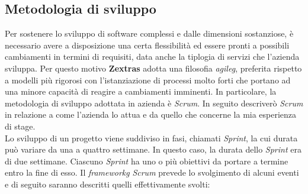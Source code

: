 \subsection{Metodologia di sviluppo}
    Per sostenere lo sviluppo di software complessi e dalle dimensioni sostanziose, è necessario avere a disposizione una certa flessibilità ed essere pronti a possibili cambiamenti in termini di requisiti, data anche la tiplogia di servizi che l'azienda sviluppa. Per questo motivo \textbf{Zextras} adotta una filosofia \textit{\gls{agileg}}, preferita rispetto a modelli più rigorosi con l'istanziazione di processi molto forti che portano ad una minore capacità di reagire a cambiamenti imminenti. In particolare, la metodologia di sviluppo adottata in azienda è \textit{Scrum}. In seguito descriverò \textit{Scrum} in relazione a come l'azienda lo attua e da quello che concerne la mia esperienza di stage. \\
    Lo sviluppo di un progetto viene suddiviso in fasi, chiamati \textit{Sprint}, la cui durata può variare da una a quattro settimane. In questo caso, la durata dello \textit{Sprint} era di due settimane.
    Ciascuno \textit{Sprint} ha uno o più obiettivi da portare a termine entro la fine di esso.
    Il \textit{\gls{frameworkg}} \textit{Scrum} prevede lo svolgimento di alcuni eventi e di seguito saranno descritti quelli effettivamente svolti:
    
